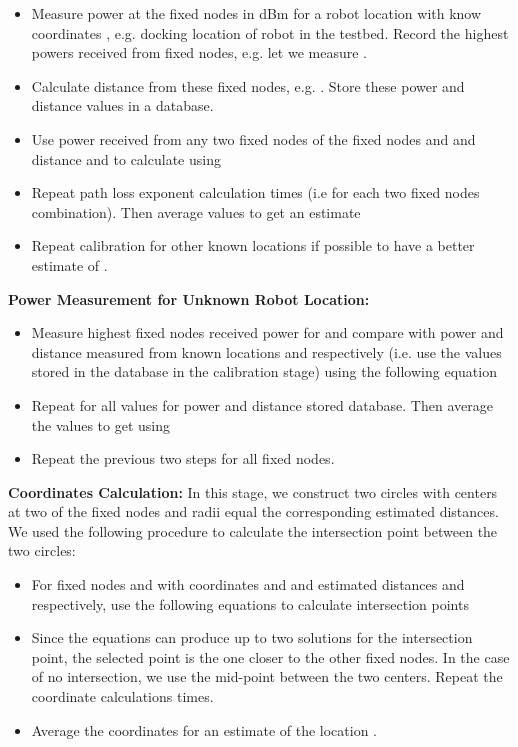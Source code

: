 \documentclass[journal]{IEEEtran} 				\IEEEoverridecommandlockouts 						\usepackage{amsmath,amssymb}
\begin{document}
    \begin{itemize}
      \item Measure power at the fixed nodes in dBm for a robot location with know coordinates , e.g. docking location of robot in the testbed. Record the highest  powers received from fixed nodes, e.g. let  we measure .
      \item Calculate distance from these  fixed nodes, e.g. . Store these power and distance values in a database.
      \item Use power received from any two fixed nodes of the  fixed nodes  and  and distance  and  to calculate   using
      
      \item Repeat path loss exponent calculation  times (i.e for each two fixed nodes combination). Then average  values to get an estimate
      
      \item Repeat calibration for other known locations if possible to have a better estimate of .
      \end{itemize}
\textbf{Power Measurement for Unknown Robot Location:}

  \begin{itemize}
  \item Measure highest  fixed nodes received power  for  and compare with power and distance measured from known locations  and  respectively (i.e. use the values stored in the database in the calibration stage) using the following equation
  
  \item Repeat for all values for power and distance stored database. Then average the values to get  using
        
  \item Repeat the previous two steps for all  fixed nodes.
  \end{itemize}
\noindent
\textbf{Coordinates Calculation:} In this stage, we construct two circles with centers at two of the  fixed nodes and radii equal the corresponding estimated distances.  We used the following procedure to calculate the intersection point between the two circles:

 \begin{itemize}
 \item For fixed nodes  and  with coordinates  and  and estimated distances  and  respectively, use the following equations to calculate intersection points 

\item Since the equations can produce up to two solutions for the intersection point,
the selected point is the one closer to the other  fixed nodes. In the case of no intersection, we use the
mid-point between the two centers. Repeat the coordinate calculations  times.

\item Average the coordinates for an estimate of the location .
\end{itemize}
\end{document}
